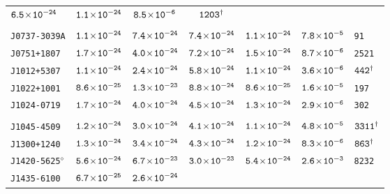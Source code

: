 \begin{longtable}{ l | c | c | c | c | c | l }
\scriptsize{$\tt{6.5\!\times\!10^{-24}}$} & \scriptsize{$\tt{1.1\!\times\!10^{-24}}$} & \scriptsize{$\tt{8.5\!\times\!10^{-6}}$} &
\scriptsize{$\tt{1203^{\dagger}}$} \\[-16pt] 
\\[-20pt] 
\scriptsize{\tt{J0737-3039A}} & \scriptsize{$\tt{1.1\!\times\!10^{-24}}$} & \scriptsize{$\tt{7.4\!\times\!10^{-24}}$} &
\scriptsize{$\tt{7.4\!\times\!10^{-24}}$} &\scriptsize{$\tt{1.1\!\times\!10^{-24}}$} & \scriptsize{$\tt{7.8\!\times\!10^{-5}}$} &
\scriptsize{\tt{91}} \\[-16pt] 
\scriptsize{\tt{J0751+1807}} & \scriptsize{$\tt{1.7\!\times\!10^{-24}}$} & \scriptsize{$\tt{4.0\!\times\!10^{-24}}$} &
\scriptsize{$\tt{7.2\!\times\!10^{-24}}$} &\scriptsize{$\tt{1.5\!\times\!10^{-24}}$} & \scriptsize{$\tt{8.7\!\times\!10^{-6}}$} &
\scriptsize{\tt{2521}} \\[-16pt] 
\scriptsize{\tt{J1012+5307}} & \scriptsize{$\tt{1.1\!\times\!10^{-24}}$} & \scriptsize{$\tt{2.4\!\times\!10^{-24}}$} &
\scriptsize{$\tt{5.8\!\times\!10^{-24}}$} & \scriptsize{$\tt{1.1\!\times\!10^{-24}}$} & \scriptsize{$\tt{3.6\!\times\!10^{-6}}$} &
\scriptsize{$\tt{442^{\dagger}}$} \\[-16pt] 
\scriptsize{\tt{J1022+1001}} & \scriptsize{$\tt{8.6\!\times\!10^{-25}}$} & \scriptsize{$\tt{1.3\!\times\!10^{-23}}$} &
\scriptsize{$\tt{8.8\!\times\!10^{-24}}$} &\scriptsize{$\tt{8.6\!\times\!10^{-25}}$} & \scriptsize{$\tt{1.6\!\times\!10^{-5}}$} &
\scriptsize{\tt{197}} \\[-16pt] 
\scriptsize{\tt{J1024-0719}} & \scriptsize{$\tt{1.7\!\times\!10^{-24}}$} & \scriptsize{$\tt{4.0\!\times\!10^{-24}}$} &
\scriptsize{$\tt{4.5\!\times\!10^{-24}}$} &\scriptsize{$\tt{1.3\!\times\!10^{-24}}$} & \scriptsize{$\tt{2.9\!\times\!10^{-6}}$} &
\scriptsize{\tt{302}} \\[-16pt] 
\\[-20pt] 
\scriptsize{\tt{J1045-4509}} & \scriptsize{$\tt{1.2\!\times\!10^{-24}}$} & \scriptsize{$\tt{3.0\!\times\!10^{-24}}$} &
\scriptsize{$\tt{4.1\!\times\!10^{-24}}$} & \scriptsize{$\tt{1.1\!\times\!10^{-24}}$} & \scriptsize{$\tt{4.8\!\times\!10^{-5}}$} &
\scriptsize{$\tt{3311^{\dagger}}$} \\[-16pt] 
\scriptsize{\tt{J1300+1240}} & \scriptsize{$\tt{1.3\!\times\!10^{-24}}$} & \scriptsize{$\tt{3.4\!\times\!10^{-24}}$} &
\scriptsize{$\tt{4.3\!\times\!10^{-24}}$} & \scriptsize{$\tt{1.2\!\times\!10^{-24}}$} & \scriptsize{$\tt{8.3\!\times\!10^{-6}}$} &
\scriptsize{$\tt{863^{\dagger}}$} \\[-16pt] 
\scriptsize{\tt{J1420-5625}$^{\diamond}$} & \scriptsize{$\tt{5.6\!\times\!10^{-24}}$} &
\scriptsize{$\tt{6.7\!\times\!10^{-23}}$} & \scriptsize{$\tt{3.0\!\times\!10^{-23}}$} &\scriptsize{$\tt{5.4\!\times\!10^{-24}}$} &
\scriptsize{$\tt{2.6\!\times\!10^{-3}}$} & \scriptsize{\tt{8232}} \\[-16pt] 
\scriptsize{\tt{J1435-6100}} & \scriptsize{$\tt{6.7\!\times\!10^{-25}}$} & \scriptsize{$\tt{2.6\!\times\!10^{-24}}$} &

\end{longtable}
